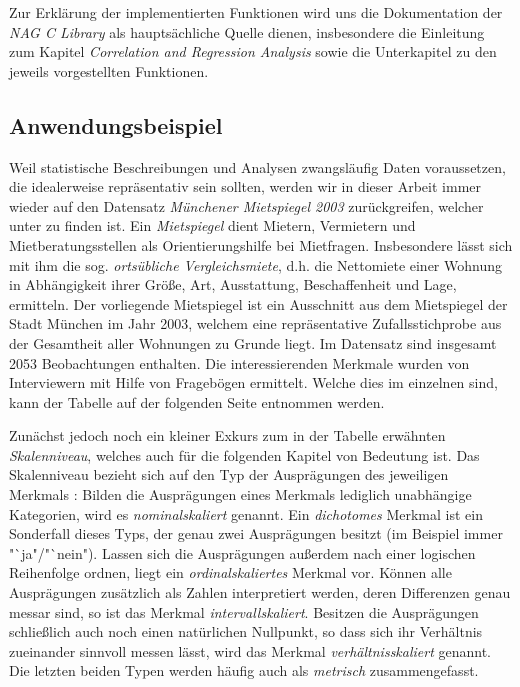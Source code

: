 Zur Erklärung der implementierten Funktionen wird uns die Dokumentation der {\it NAG C Library} als hauptsächliche Quelle dienen, insbesondere die Einleitung zum Kapitel {\it Correlation and Regression Analysis} \cite{nag:intro} sowie die Unterkapitel zu den jeweils vorgestellten Funktionen.

\subsection{Anwendungsbeispiel}
\label{sec:beispiel}

Weil statistische Beschreibungen und Analysen zwangsläufig Daten voraussetzen, die idealerweise repräsentativ sein sollten, werden wir in dieser Arbeit immer wieder auf den Datensatz {\it Münchener Mietspiegel 2003} zurückgreifen, welcher unter \cite{Fahrmeir2011} zu finden ist. Ein {\it Mietspiegel} \cite[S. 2]{Fahrmeir2010}dient Mietern, Vermietern und Mietberatungsstellen als Orientierungshilfe bei Mietfragen. Insbesondere lässt sich mit ihm die sog. {\it ortsübliche Vergleichsmiete}, d.h. die Nettomiete einer Wohnung in Abhängigkeit ihrer Größe, Art, Ausstattung, Beschaffenheit und Lage, ermitteln. Der vorliegende Mietspiegel ist ein Ausschnitt aus dem Mietspiegel der Stadt München im Jahr 2003, welchem eine repräsentative Zufallsstichprobe aus der Gesamtheit aller Wohnungen zu Grunde liegt.  Im Datensatz sind insgesamt 2053 Beobachtungen enthalten. Die interessierenden Merkmale wurden von Interviewern mit Hilfe von Fragebögen ermittelt. Welche dies im einzelnen sind, kann der Tabelle auf der folgenden Seite entnommen werden.

Zunächst jedoch noch ein kleiner Exkurs zum in der Tabelle erwähnten {\it Skalenniveau}, welches auch für die folgenden Kapitel von Bedeutung ist. Das Skalenniveau bezieht sich auf den Typ der Ausprägungen des jeweiligen Merkmals \cite[S. 17-18]{Fahrmeir2010}: Bilden die Ausprägungen eines Merkmals lediglich unabhängige Kategorien, wird es {\it nominalskaliert} genannt. Ein {\it dichotomes} Merkmal ist ein Sonderfall dieses Typs, der genau zwei Ausprägungen besitzt (im Beispiel immer "`ja"/"`nein"). Lassen sich die Ausprägungen außerdem nach einer logischen Reihenfolge ordnen, liegt ein {\it ordinalskaliertes} Merkmal vor. Können alle Ausprägungen zusätzlich als Zahlen interpretiert werden, deren Differenzen genau messar sind, so ist das Merkmal {\it intervallskaliert}. Besitzen die Ausprägungen schließlich auch noch einen natürlichen Nullpunkt, so dass sich ihr Verhältnis zueinander sinnvoll messen lässt, wird das Merkmal {\it verhältnisskaliert} genannt. Die letzten beiden Typen werden häufig auch als {\it metrisch} zusammengefasst.\\

